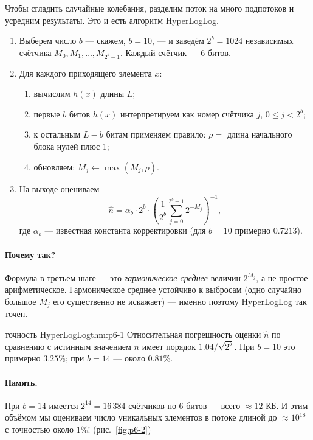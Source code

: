 Чтобы сгладить случайные колебания, разделим поток на много подпотоков и усредним результаты. Это и есть алгоритм HyperLogLog.

\begin{algorithmbox}[title={Алгоритм: HyperLogLog (упрощённая схема)}]
\begin{enumerate}
  \item Выберем число $b$ --- скажем, $b = 10$, --- и заведём $2^b = 1024$ независимых счётчика $M_0, M_1, \dots, M_{2^b - 1}$. Каждый счётчик --- 6 битов.
  \item Для каждого приходящего элемента $x$:
  \begin{enumerate}
    \item вычислим $h(x)$ длины $L$;
    \item первые $b$ битов $h(x)$ интерпретируем как номер счётчика $j$, $0 \le j < 2^b$;
    \item к остальным $L - b$ битам применяем правило: $\rho = $ длина начального блока нулей плюс 1;
    \item обновляем: $M_j \leftarrow \max(M_j, \rho)$.
  \end{enumerate}
  \item На выходе оцениваем
  \[
    \widehat{n} = \alpha_b \cdot 2^b \cdot \left( \frac{1}{2^b} \sum_{j=0}^{2^b-1} 2^{-M_j} \right)^{-1},
  \]
  где $\alpha_b$ --- известная константа корректировки (для $b = 10$ примерно $0.7213$).
\end{enumerate}
\end{algorithmbox}

\paragraph*{Почему так?} Формула в третьем шаге --- это \emph{гармоническое среднее} величин $2^{M_j}$, а не простое арифметическое. Гармоническое среднее устойчиво к выбросам (одно случайно большое $M_j$ его существенно не искажает) --- именно поэтому HyperLogLog так точен.

\begin{theorem}{точность HyperLogLog}{thm:p6-1}
Относительная погрешность оценки $\widehat{n}$ по сравнению с истинным значением $n$ имеет порядок $1.04/\sqrt{2^b}$. При $b = 10$ это примерно $3.25\%$; при $b = 14$ --- около $0.81\%$.
\end{theorem}

\paragraph*{Память.} При $b = 14$ имеется $2^{14} = 16\,384$ счётчиков по 6 битов --- всего $\approx 12$ КБ. И этим объёмом мы оцениваем число уникальных элементов в потоке длиной до $\approx 10^{18}$ с точностью около $1\%$! (рис.~\ref{fig:p6-2})


